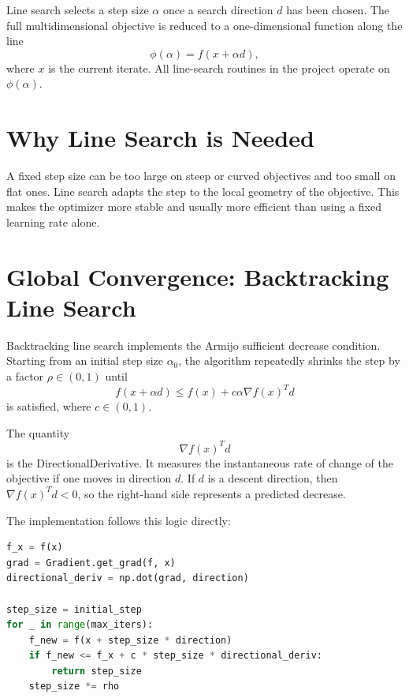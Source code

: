 \documentclass[12pt,a4paper]{report}
\begin{document}
Line search selects a step size $\alpha$ once a search direction $d$ has been chosen. The full multidimensional objective is reduced to a one-dimensional function along the line
\begin{equation}
\phi(\alpha) = f(x + \alpha d),
\end{equation}
where $x$ is the current iterate. All line-search routines in the project operate on $\phi(\alpha)$.

\section{Why Line Search is Needed}

A fixed step size can be too large on steep or curved objectives and too small on flat ones. Line search adapts the step to the local geometry of the objective. This makes the optimizer more stable and usually more efficient than using a fixed learning rate alone.

\section{Global Convergence: Backtracking Line Search}

Backtracking line search implements the Armijo sufficient decrease condition. Starting from an initial step size $\alpha_0$, the algorithm repeatedly shrinks the step by a factor $\rho \in (0,1)$ until
\begin{equation}
f(x + \alpha d) \leq f(x) + c \alpha \nabla f(x)^T d
\end{equation}
is satisfied, where $c \in (0,1)$.

The quantity
\begin{equation}
\nabla f(x)^T d
\end{equation}
is the \gls{DirectionalDerivative}. It measures the instantaneous rate of change of the objective if one moves in direction $d$. If $d$ is a descent direction, then $\nabla f(x)^T d < 0$, so the right-hand side represents a predicted decrease.

The implementation follows this logic directly:
\begin{lstlisting}[language=Python]
f_x = f(x)
grad = Gradient.get_grad(f, x)
directional_deriv = np.dot(grad, direction)

step_size = initial_step
for _ in range(max_iters):
    f_new = f(x + step_size * direction)
    if f_new <= f_x + c * step_size * directional_deriv:
        return step_size
    step_size *= rho
\end{lstlisting}
\end{document}
